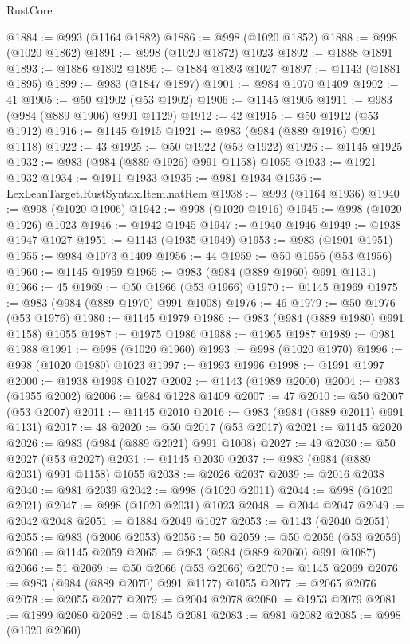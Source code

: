 \begin{lexlean}{RustCore}
\begin{coremodule}
@1884 := @993 (@1164 @1882)
@1886 := @998 (@1020 @1852)
@1888 := @998 (@1020 @1862)
@1891 := @998 (@1020 @1872) @1023
@1892 := @1888 @1891
@1893 := @1886 @1892
@1895 := @1884 @1893 @1027
@1897 := @1143 (@1881 @1895)
@1899 := @983 (@1847 @1897)
@1901 := @984 @1070 @1409
@1902 := 41
@1905 := @50 @1902 (@53 @1902)
@1906 := @1145 @1905
@1911 := @983 (@984 (@889 @1906) @991 @1129)
@1912 := 42
@1915 := @50 @1912 (@53 @1912)
@1916 := @1145 @1915
@1921 := @983 (@984 (@889 @1916) @991 @1118)
@1922 := 43
@1925 := @50 @1922 (@53 @1922)
@1926 := @1145 @1925
@1932 := @983 (@984 (@889 @1926) @991 @1158) @1055
@1933 := @1921 @1932
@1934 := @1911 @1933
@1935 := @981 @1934
@1936 := LexLeanTarget.RustSyntax.Item.natRem
@1938 := @993 (@1164 @1936)
@1940 := @998 (@1020 @1906)
@1942 := @998 (@1020 @1916)
@1945 := @998 (@1020 @1926) @1023
@1946 := @1942 @1945
@1947 := @1940 @1946
@1949 := @1938 @1947 @1027
@1951 := @1143 (@1935 @1949)
@1953 := @983 (@1901 @1951)
@1955 := @984 @1073 @1409
@1956 := 44
@1959 := @50 @1956 (@53 @1956)
@1960 := @1145 @1959
@1965 := @983 (@984 (@889 @1960) @991 @1131)
@1966 := 45
@1969 := @50 @1966 (@53 @1966)
@1970 := @1145 @1969
@1975 := @983 (@984 (@889 @1970) @991 @1008)
@1976 := 46
@1979 := @50 @1976 (@53 @1976)
@1980 := @1145 @1979
@1986 := @983 (@984 (@889 @1980) @991 @1158) @1055
@1987 := @1975 @1986
@1988 := @1965 @1987
@1989 := @981 @1988
@1991 := @998 (@1020 @1960)
@1993 := @998 (@1020 @1970)
@1996 := @998 (@1020 @1980) @1023
@1997 := @1993 @1996
@1998 := @1991 @1997
@2000 := @1938 @1998 @1027
@2002 := @1143 (@1989 @2000)
@2004 := @983 (@1955 @2002)
@2006 := @984 @1228 @1409
@2007 := 47
@2010 := @50 @2007 (@53 @2007)
@2011 := @1145 @2010
@2016 := @983 (@984 (@889 @2011) @991 @1131)
@2017 := 48
@2020 := @50 @2017 (@53 @2017)
@2021 := @1145 @2020
@2026 := @983 (@984 (@889 @2021) @991 @1008)
@2027 := 49
@2030 := @50 @2027 (@53 @2027)
@2031 := @1145 @2030
@2037 := @983 (@984 (@889 @2031) @991 @1158) @1055
@2038 := @2026 @2037
@2039 := @2016 @2038
@2040 := @981 @2039
@2042 := @998 (@1020 @2011)
@2044 := @998 (@1020 @2021)
@2047 := @998 (@1020 @2031) @1023
@2048 := @2044 @2047
@2049 := @2042 @2048
@2051 := @1884 @2049 @1027
@2053 := @1143 (@2040 @2051)
@2055 := @983 (@2006 @2053)
@2056 := 50
@2059 := @50 @2056 (@53 @2056)
@2060 := @1145 @2059
@2065 := @983 (@984 (@889 @2060) @991 @1087)
@2066 := 51
@2069 := @50 @2066 (@53 @2066)
@2070 := @1145 @2069
@2076 := @983 (@984 (@889 @2070) @991 @1177) @1055
@2077 := @2065 @2076
@2078 := @2055 @2077
@2079 := @2004 @2078
@2080 := @1953 @2079
@2081 := @1899 @2080
@2082 := @1845 @2081
@2083 := @981 @2082
@2085 := @998 (@1020 @2060)

\end{coremodule}
\end{lexlean}
